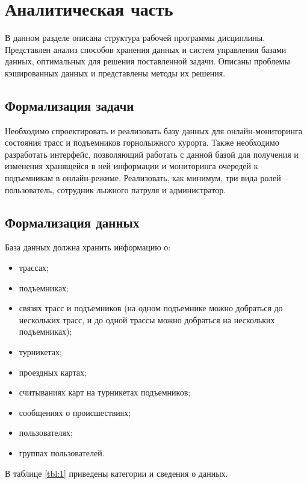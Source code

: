\chapter{Аналитическая часть}

В данном разделе описана структура рабочей программы дисциплины. Представлен анализ способов хранения данных и систем управления базами данных, оптимальных для решения поставленной задачи. Описаны проблемы кэшированных данных и представлены методы их решения.

\section{Формализация задачи}

Необходимо спроектировать и реализовать базу данных для онлайн-мониторинга состояния трасс и подъемников горнолыжного курорта. Также необходимо разработать интерфейс, позволяющий работать с данной базой для получения и изменения хранящейся в ней информации и мониторинга очередей к подъемникам в онлайн-режиме. Реализовать, как минимум, три вида ролей – пользователь, сотрудник лыжного патруля и администратор.

\section{Формализация данных}

База данных должна хранить информацию о:
\begin{itemize}
	\item трассах;
	\item подъемниках;
	\item связях трасс и подъемников (на одном подъемнике можно добраться до нескольких трасс, и до одной трассы можно добраться на нескольких подъемниках);
	\item турникетах;
	\item проездных картах;
	\item считываниях карт на турникетах подъемников;
	\item сообщениях о происшествиях;
	\item пользователях;
	\item группах пользователей.
\end{itemize}

В таблице \ref{tbl:1} приведены категории и сведения о данных.

